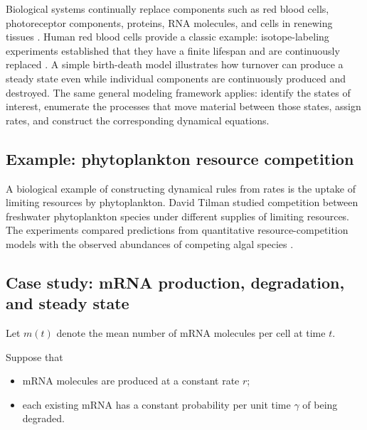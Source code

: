 
Biological systems continually replace components such as red blood cells, photoreceptor components, proteins, RNA molecules, and cells in renewing tissues \cite{reddien2024purpose}.
Human red blood cells provide a classic example: isotope-labeling experiments established that they have a finite lifespan and are continuously replaced \cite{shemin1946life}.
A simple birth-death model illustrates how turnover can produce a steady state even while individual components are continuously produced and destroyed.
The same general modeling framework applies: identify the states of interest, enumerate the processes that move material between those states, assign rates, and construct the corresponding dynamical equations.

\subsection{Example: phytoplankton resource competition}
\label{sec:plankton}
A biological example of constructing dynamical rules from rates is the uptake of limiting resources by phytoplankton.
David Tilman studied competition between freshwater phytoplankton species under different supplies of limiting resources.
The experiments compared predictions from quantitative resource-competition models with the observed abundances of competing algal species \cite{tilman1977resource}.

\subsection{Case study: mRNA production, degradation, and steady state}
\label{sec:mrna-mean}



Let $m(t)$ denote the mean number of mRNA molecules per cell at time $t$.

Suppose that
\begin{itemize}
    \item mRNA molecules are produced at a constant rate $r$;
    \item each existing mRNA has a constant probability per unit time $\gamma$ of being degraded.
\end{itemize}

